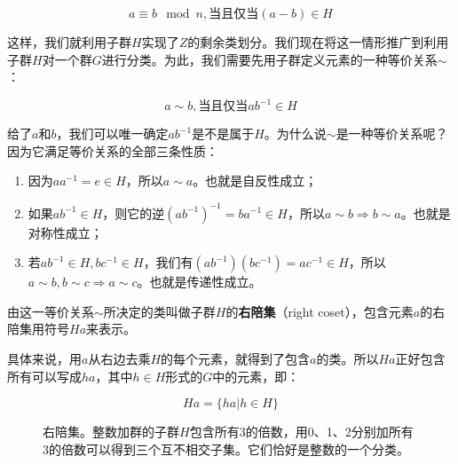 \documentclass[b5paper]{ctexart}
\begin{document}
\[
a \equiv b \mod n, \text{当且仅当} (a - b) \in H
\]

这样，我们就利用子群$H$实现了$Z$的剩余类划分。我们现在将这一情形推广到利用子群$H$对一个群$G$进行分类。为此，我们需要先用子群定义元素的一种等价关系$\sim$：

\[
a \sim b, \text{当且仅当} ab^{-1} \in H
\]

给了$a$和$b$，我们可以唯一确定$ab^{-1}$是不是属于$H$。为什么说$\sim$是一种等价关系呢？因为它满足等价关系的全部三条性质：

\begin{enumerate}
\item 因为$aa^{-1} = e \in H$，所以$a \sim a$。也就是自反性成立；
\item 如果$ab^{-1} \in H$，则它的逆$(ab^{-1})^{-1}= ba^{-1} \in H$，所以$a \sim b \Rightarrow b \sim a$。也就是对称性成立；
\item 若$ab^{-1} \in H, bc^{-1} \in H$，我们有$(ab^{-1})(bc^{-1}) = ac^{-1} \in H$，所以$a \sim b, b \sim c \Rightarrow a \sim c$。也就是传递性成立。
\end{enumerate}

\begin{definition}
由这一等价关系$\sim$所决定的类叫做子群$H$的\textbf{右陪集}（right coset），包含元素$a$的右陪集用符号$Ha$来表示。
\end{definition}

具体来说，用$a$从右边去乘$H$的每个元素，就得到了包含$a$的类。所以$Ha$正好包含所有可以写成$ha$，其中$h \in H$形式的$G$中的元素，即：

\[
Ha = \{ha | h \in H\}
\]

\begin{figure}[htbp]
\centering
{}
\caption{右陪集。整数加群的子群$H$包含所有3的倍数，用0、1、2分别加所有3的倍数可以得到三个互不相交子集。它们恰好是整数的一个分类。}
\label{fig:right-cosets-Z3}
\end{figure}
\end{document}
